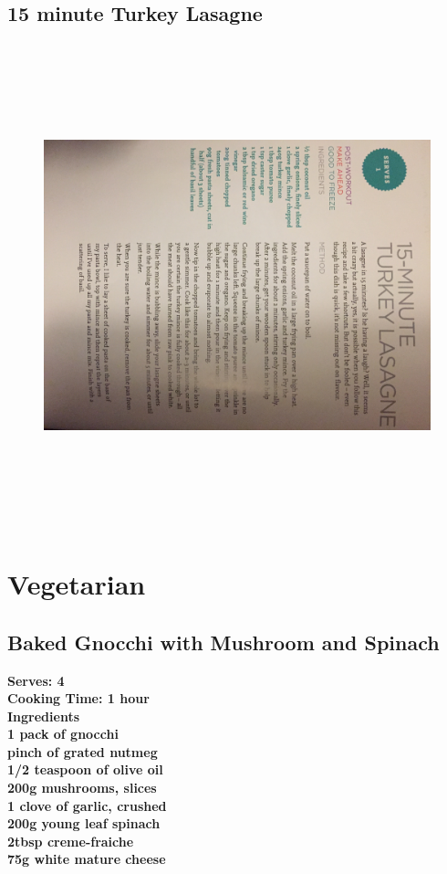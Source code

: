 \documentclass[18pt, oneside]{book}
\begin{document}
\section{15 minute Turkey Lasagne}
\begin{figure}[h!]
  \begin{center}
  \includegraphics[height = 14cm, angle=270]{TurkeyLasagne}
  \end{center}
\end{figure}

\chapter{Vegetarian}

\section{Baked Gnocchi with Mushroom and Spinach}
\bf{Serves: 4} \\
\bf{Cooking Time: 1 hour} \\

\bf{Ingredients} \normalfont \\
1 pack of gnocchi \\
pinch of grated nutmeg \\
1/2 teaspoon of olive oil \\
200g mushrooms, slices \\
1 clove of garlic, crushed \\
200g young leaf spinach \\
2tbsp creme-fraiche \\
75g white mature cheese \\
\end{document}
